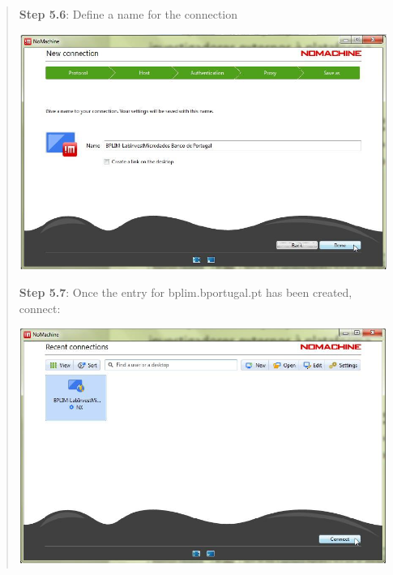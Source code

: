 \documentclass[]{book}
\begin{document}
\begin{quote}
\textbf{Step 5.6}: Define a name for the connection

\includegraphics[width=4.72441in,height=3.03165in]{./media/image31.png}

\textbf{Step 5.7}: Once the entry for bplim.bportugal.pt has been created,
connect:

\includegraphics[width=4.72441in,height=3.03698in]{./media/image32.png}
\end{quote}

\textbf{\\
}
\end{document}
